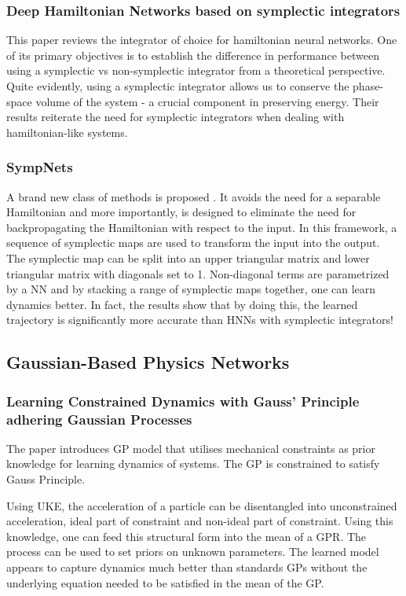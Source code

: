 \documentclass{article}
\begin{document}
\subsubsection{Deep Hamiltonian Networks based on symplectic integrators}

This paper \cite{zhu_deep_2020} reviews the integrator of choice for hamiltonian neural networks. One of its primary objectives is to establish the difference in performance between using a symplectic vs non-symplectic integrator from a theoretical perspective. Quite evidently, using a symplectic integrator allows us to conserve the phase-space volume of the system - a crucial component in preserving energy. Their results reiterate the need for symplectic integrators when dealing with hamiltonian-like systems.

\subsubsection{SympNets}

A brand new class of methods is proposed . It avoids the need for a separable Hamiltonian and more importantly, is designed to eliminate the need for backpropagating the Hamiltonian with respect to the input. In this framework, a sequence of symplectic maps are used to transform the input into the output. The symplectic map can be split into an upper triangular matrix and lower triangular matrix with diagonals set to 1. Non-diagonal terms are parametrized by a NN and by stacking a range of symplectic maps together, one can learn dynamics better. In fact, the results show that by doing this, the learned trajectory is significantly more accurate than HNNs with symplectic integrators!

\subsection{Gaussian-Based Physics Networks}
\subsubsection{Learning Constrained Dynamics with Gauss' Principle adhering Gaussian Processes}

The paper \cite{geist_learning_2020} introduces GP model that utilises mechanical constraints as prior knowledge for learning dynamics of systems. The GP is constrained to satisfy Gauss Principle. 

Using UKE, the acceleration of a particle can be disentangled into unconstrained acceleration, ideal part of constraint and non-ideal part of constraint.  Using this knowledge, one can feed this structural form into the mean of a GPR. The process can be used to set priors on unknown parameters. The learned model appears to capture dynamics much better than standards GPs without the underlying equation needed to be satisfied in the mean of the GP.
\end{document}
